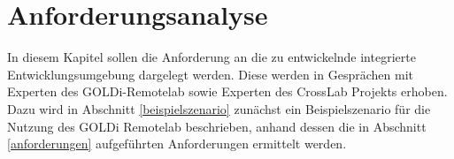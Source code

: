 \chapter{Anforderungsanalyse} \label{anforderungsanalyse}

In diesem Kapitel sollen die Anforderung an die zu entwickelnde integrierte Entwicklungsumgebung dargelegt werden. Diese werden in Gesprächen mit Experten des GOLDi-Remotelab sowie Experten des CrossLab Projekts erhoben. Dazu wird in Abschnitt \ref{beispielszenario} zunächst ein Beispielszenario für die Nutzung des GOLDi Remotelab beschrieben, anhand dessen die in Abschnitt \ref{anforderungen} aufgeführten Anforderungen ermittelt werden.



